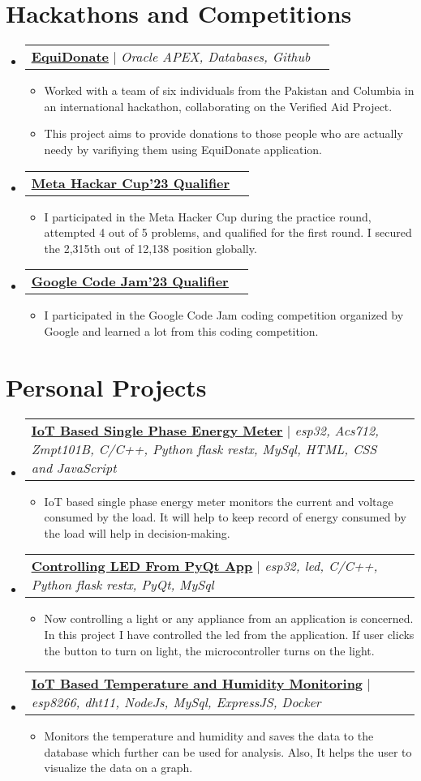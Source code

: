 \documentclass[letterpaper,11pt]{article}
\makeatletter
\newcommand{\resumeItem}[1]{
  \item\small{
    {#1 \vspace{-2pt}}
  }
}
\newcommand{\resumeProjectHeading}[2]{
    \item
    \begin{tabular*}{0.97\textwidth}{l@{\extracolsep{\fill}}r}
      \small#1 & #2 \\
    \end{tabular*}\vspace{-7pt}
}
\newcommand{\resumeSubHeadingListStart}{\begin{itemize}[leftmargin=0.15in, label={}]}
\newcommand{\resumeSubHeadingListEnd}{\end{itemize}}
\newcommand{\resumeItemListStart}{\begin{itemize}}
\newcommand{\resumeItemListEnd}{\end{itemize}\vspace{-5pt}}
\makeatother
\begin{document}
\section{Hackathons and Competitions}
\resumeSubHeadingListStart
\resumeProjectHeading
{\textbf{\href{https://github.com/inamprograms/EquiDonate}{\underline{EquiDonate}}} $|$ \emph{Oracle APEX, Databases, Github}}{}
\resumeItemListStart
\resumeItem{Worked with a team of six individuals from the Pakistan and Columbia in an international hackathon, collaborating on the Verified Aid Project.}
\resumeItem{This project aims to provide donations to those people who are actually needy by varifiying them using EquiDonate application.}
\resumeItemListEnd
\resumeProjectHeading
{\textbf{\href{https://shorturl.at/kHNZ2}{\underline{Meta Hackar Cup'23 Qualifier}}}}{}
\resumeItemListStart
\resumeItem{I participated in the Meta Hacker Cup during the practice round, attempted 4 out of 5 problems, and qualified for the first round. I secured the 2,315th out of 12,138 position globally.}
\resumeItemListEnd
\resumeProjectHeading
{\textbf{\href{https://shorturl.at/myRTX}{\underline{Google Code Jam'23 Qualifier}}}}{}
\resumeItemListStart
\resumeItem{I participated in the Google Code Jam coding competition organized by Google and learned a lot from this coding competition.}
\resumeItemListEnd
\resumeSubHeadingListEnd
%


\section{Personal Projects}
\resumeSubHeadingListStart
\resumeProjectHeading
{\textbf{\href{https://github.com/inamprograms/IoT-based-single-phase-energy-meter}{\underline{IoT Based Single Phase Energy Meter}}} $|$ \emph{esp32, Acs712, Zmpt101B, C/C++, Python flask restx, MySql, HTML, CSS and JavaScript}}{}
\resumeItemListStart
\resumeItem{IoT based single phase energy meter monitors the current and voltage consumed by the load.
  It will help to keep record of energy consumed by the load will help in decision-making.}
\resumeItemListEnd
\resumeProjectHeading
{\textbf{\href{https://github.com/inamprograms/esp32/tree/main/PYQT/guiAppQtpy6}{\underline{Controlling LED From PyQt App}}} $|$ \emph{esp32, led, C/C++, Python flask restx, PyQt, 
    MySql}}{}
\resumeItemListStart
\resumeItem{Now controlling a light or any appliance from an application is concerned.
  In this project I have controlled the led from the application. If user clicks the 
  button to turn on light, the microcontroller turns on the light.}
\resumeItemListEnd
\resumeProjectHeading
{\textbf{\href{https://github.com/inamprograms/IoT-based-tem_hum-monitoring}{\underline{IoT Based Temperature and Humidity Monitoring}}} $|$ \emph{esp8266, dht11, NodeJs, MySql, ExpressJS,
  Docker}}{}
\resumeItemListStart
\resumeItem{Monitors the temperature and humidity and saves the data to the database which further can be used for analysis. 
  Also, It helps the user to visualize the data on a graph.}
\resumeItemListEnd
\resumeSubHeadingListEnd
%
\end{document}
